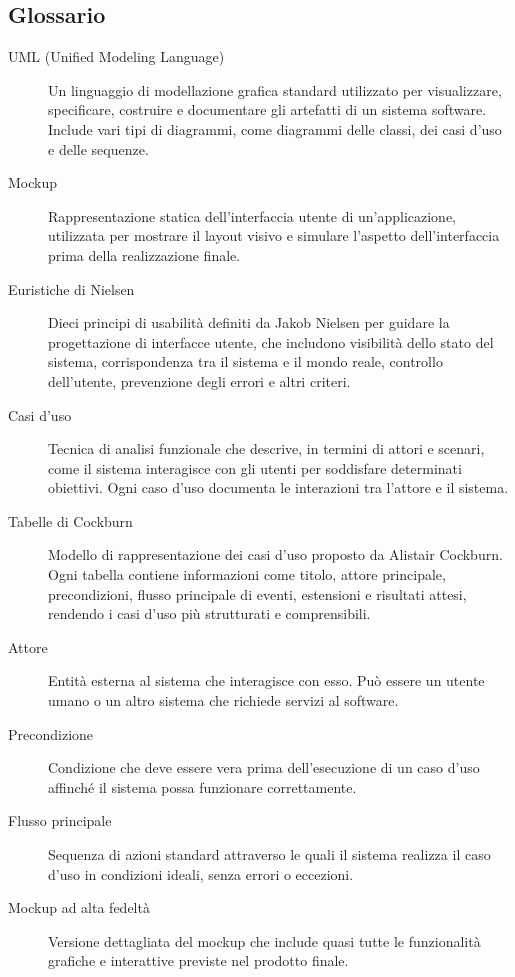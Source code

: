 \subsection{Glossario}

\begin{description}

    \item[UML (Unified Modeling Language)] Un linguaggio di modellazione grafica standard utilizzato per visualizzare, specificare, costruire e documentare gli artefatti di un sistema software. Include vari tipi di diagrammi, come diagrammi delle classi, dei casi d'uso e delle sequenze.

    \item[Mockup] Rappresentazione statica dell'interfaccia utente di un'applicazione, utilizzata per mostrare il layout visivo e simulare l'aspetto dell'interfaccia prima della realizzazione finale.

    \item[Euristiche di Nielsen] Dieci principi di usabilità definiti da Jakob Nielsen per guidare la progettazione di interfacce utente, che includono visibilità dello stato del sistema, corrispondenza tra il sistema e il mondo reale, controllo dell'utente, prevenzione degli errori e altri criteri.

    \item[Casi d'uso] Tecnica di analisi funzionale che descrive, in termini di attori e scenari, come il sistema interagisce con gli utenti per soddisfare determinati obiettivi. Ogni caso d'uso documenta le interazioni tra l'attore e il sistema.

    \item[Tabelle di Cockburn] Modello di rappresentazione dei casi d'uso proposto da Alistair Cockburn. Ogni tabella contiene informazioni come titolo, attore principale, precondizioni, flusso principale di eventi, estensioni e risultati attesi, rendendo i casi d'uso più strutturati e comprensibili.

    \item[Attore] Entità esterna al sistema che interagisce con esso. Può essere un utente umano o un altro sistema che richiede servizi al software.

    \item[Precondizione] Condizione che deve essere vera prima dell'esecuzione di un caso d'uso affinché il sistema possa funzionare correttamente.

    \item[Flusso principale] Sequenza di azioni standard attraverso le quali il sistema realizza il caso d'uso in condizioni ideali, senza errori o eccezioni.

    \item[Mockup ad alta fedeltà] Versione dettagliata del mockup che include quasi tutte le funzionalità grafiche e interattive previste nel prodotto finale.

\end{description}